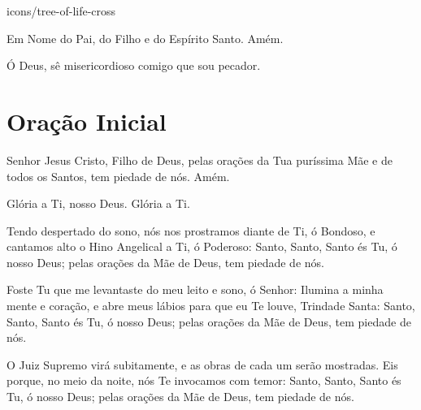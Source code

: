 \documentclass{subfiles}
\begin{document}
\begin{chapterimg}[height=.9\textheight]{icons/tree-of-life-cross}
\end{chapterimg}

 
Em Nome do Pai, do Filho e do Espírito Santo. Amém. 
 
 
Ó Deus, sê misericordioso comigo que sou pecador. 

\section*{Oração Inicial}

Senhor Jesus Cristo, Filho de Deus, pelas orações da Tua puríssima Mãe 
e de todos os Santos, tem piedade de nós. Amém. 
 
Glória a Ti, nosso Deus. Glória a Ti. 
 
\comforter{}
 
\trisagion{} \thrice{}

\Doxology{}

\holytrinity{}
 
\mercy{} \thrice{}

\Doxology{}
 
\ourFather{}


Tendo despertado do sono, nós nos prostramos diante de Ti, ó 
Bondoso, e cantamos alto o Hino Angelical a Ti, ó Poderoso: Santo, Santo, Santo 
és Tu, ó nosso Deus; pelas orações da Mãe de Deus, tem piedade de nós. 
 
\doxology{}

Foste Tu que me levantaste do meu leito e sono, ó Senhor: Ilumina a minha mente
e coração, e abre meus lábios para que eu Te louve, Trindade Santa: Santo, Santo,
Santo és Tu, ó nosso Deus; pelas orações da Mãe de Deus, tem piedade de nós. 
 
\nowandever{}

O Juiz Supremo virá subitamente, e as obras de cada um serão mostradas. Eis
porque, no meio da noite, nós Te invocamos com temor: Santo, Santo, Santo és Tu,
ó nosso Deus; pelas orações da Mãe de Deus, tem piedade de nós.
\end{document}
